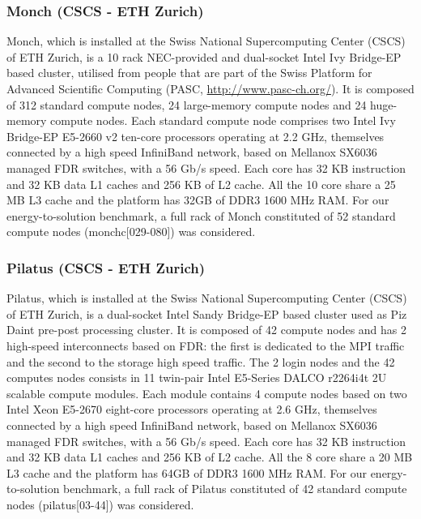 \subsubsection{Monch (CSCS - ETH Zurich)}
Monch, which is installed  at the Swiss National Supercomputing Center
(CSCS) of ETH Zurich, is  a 10 rack NEC-provided and dual-socket Intel
Ivy Bridge-EP based cluster, utilised from people that are part of the
Swiss    Platform   for    Advanced   Scientific    Computing   (PASC,
\url{http://www.pasc-ch.org/}). It is composed of 312 standard compute
nodes, 24 large-memory compute nodes and 24 huge-memory compute nodes.
Each standard  compute node comprises two Intel  Ivy Bridge-EP E5-2660
v2 ten-core processors operating at 2.2 GHz, themselves connected by a
high speed  InfiniBand network, based  on Mellanox SX6036  managed FDR
switches, with a  56 Gb/s speed.  Each core has  32 KB instruction and
32 KB data L1  caches and 256 KB of L2 cache. All  the 10 core share a
25 MB L3 cache and the platform has 32GB of DDR3 1600 MHz RAM. For our
energy-to-solution benchmark,  a full rack of Monch  constituted of 52
standard  compute   nodes  (monchc[029-080])  was   considered.

\subsubsection{Pilatus (CSCS - ETH Zurich)}
Pilatus,  which  is installed  at  the  Swiss National  Supercomputing
Center (CSCS)  of ETH Zurich,  is a dual-socket Intel  Sandy Bridge-EP
based cluster  used as Piz  Daint pre-post processing cluster.   It is
composed of 42 compute nodes  and has 2 high-speed interconnects based
on FDR:  the first is dedicated to  the MPI traffic and  the second to
the storage high speed traffic.  The 2 login nodes and the 42 computes
nodes  consists in  11  twin-pair Intel  E5-Series  DALCO r2264i4t  2U
scalable compute modules.  Each  module contains 4 compute nodes based
on two Intel Xeon E5-2670  eight-core processors operating at 2.6 GHz,
themselves  connected by  a high  speed InfiniBand  network,  based on
Mellanox SX6036 managed FDR switches,  with a 56 Gb/s speed. Each core
has 32 KB instruction and 32 KB data L1 caches and 256 KB of L2 cache.
All the  8 core share a  20 MB L3 cache  and the platform  has 64GB of
DDR3 1600 MHz  RAM. For our energy-to-solution benchmark,  a full rack
of Pilatus  constituted of 42 standard  compute nodes (pilatus[03-44])
was considered.


